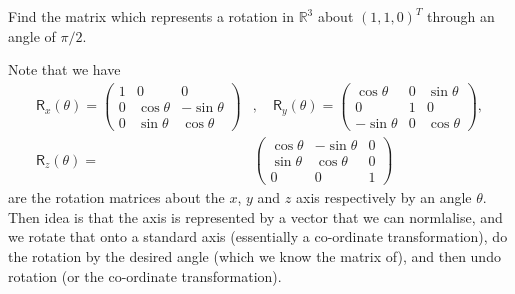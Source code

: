 \documentclass[letter-paper]{tufte-book}
\newenvironment{example}[1][Example]{\begin{trivlist}
\item[\hskip \labelsep {\bfseries #1}]}{\end{trivlist}}
\begin{document}
\begin{example}
  Find the matrix which represents a rotation in $\mathbb{R}^3$ about
  $(1,1,0)^T$ through an angle of $\pi/2$.
  
  Note that we have
  \begin{align*}
    \mathsf{R}_x(\theta) = \begin{pmatrix}1 & 0 & 0 \\ 0 & \cos\theta & -\sin\theta \\ 0 & \sin\theta & \cos\theta\end{pmatrix}&, \quad
    \mathsf{R}_y(\theta) = \begin{pmatrix}\cos\theta & 0 & \sin\theta \\ 0 & 1 & 0 \\ -\sin\theta & 0 & \cos\theta\end{pmatrix}, \\
    \mathsf{R}_z(\theta) = &\begin{pmatrix}\cos\theta & -\sin\theta & 0 \\ \sin\theta & \cos\theta & 0 \\ 0 & 0 & 1\end{pmatrix}
  \end{align*}
  are the rotation matrices about the $x$, $y$ and $z$ axis respectively by an
  angle $\theta$. Then idea is that the axis is represented by a vector that we
  can normlalise, and we rotate that onto a standard axis (essentially a
  co-ordinate transformation), do the rotation by the desired angle (which we
  know the matrix of), and then undo rotation (or the co-ordinate
  transformation).
  

\end{example}
\end{document}
